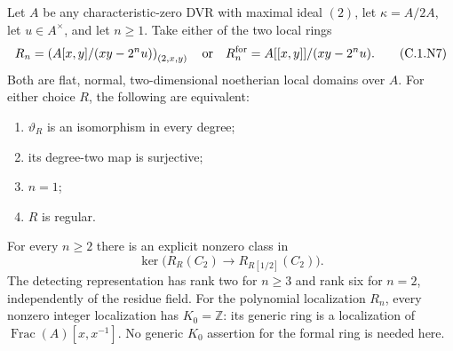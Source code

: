 \begin{theorem}
\label{C:dyadic_normal_node_criterion}
Let $A$ be any characteristic-zero DVR with maximal ideal $(2)$,
let $\kappa=A/2A$, let $u\in A^\times$, and let $n\ge1$.
Take either of the two local rings
\[
 R_n=\left(A[x,y]/(xy-2^nu)\right)_{(2,x,y)}
 \quad\hbox{or}\quad
 R_n^{\mathrm{for}}=A[[x,y]]/(xy-2^nu).                    \tag{C.1.N7}
\]
Both are flat, normal, two-dimensional noetherian local domains
over $A$. For either choice $R$, the following are equivalent:
\begin{enumerate}
\item $\vartheta_R$ is an isomorphism in every degree;
\item its degree-two map is surjective;
\item $n=1$;
\item $R$ is regular.
\end{enumerate}
For every $n\ge2$ there is an explicit nonzero class in
\[
       \ker\bigl(R_R(C_2)\longrightarrow R_{R[1/2]}(C_2)\bigr).
                                                               \tag{C.1.N8}
\]
The detecting representation has rank two for $n\ge3$ and rank
six for $n=2$, independently of the residue field.
For the polynomial localization $R_n$, every nonzero
integer localization has $K_0=\mathbb Z$: its generic ring
is a localization of $\operatorname{Frac}(A)[x,x^{-1}]$.
No generic $K_0$ assertion for the formal ring is needed here.
\end{theorem}
